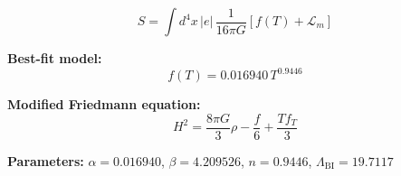 
\begin{equation}
  S = \int d^4x \, |e| \, \frac{1}{16\pi G} \left[ f(T) + \mathcal{L}_m \right]
\end{equation}

\textbf{Best-fit model:}
\begin{equation}
  f(T) = 0.016940 \, T^{0.9446}
\end{equation}

\textbf{Modified Friedmann equation:}
\begin{equation}
  H^2 = \frac{8\pi G}{3} \rho - \frac{f}{6} + \frac{T f_T}{3}
\end{equation}

\textbf{Parameters:}
$\alpha = 0.016940$, \quad
$\beta = 4.209526$, \quad
$n = 0.9446$, \quad
$\Lambda_{\text{BI}} = 19.7117$